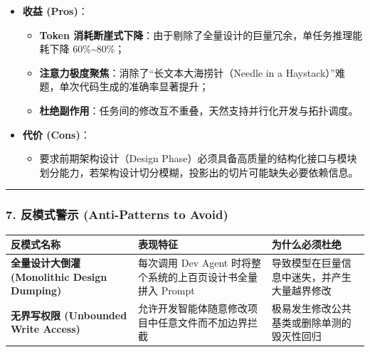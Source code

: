 \begin{itemize}
\tightlist
\item
  \textbf{收益 (Pros)}：

  \begin{itemize}
  \tightlist
  \item
    \textbf{Token
    消耗断崖式下降}：由于剔除了全量设计的巨量冗余，单任务推理能耗下降
    60\%\textasciitilde80\%；
  \item
    \textbf{注意力极度聚焦}：消除了``长文本大海捞针（Needle in a
    Haystack）''难题，单次代码生成的准确率显著提升；
  \item
    \textbf{杜绝副作用}：任务间的修改互不重叠，天然支持并行化开发与拓扑调度。
  \end{itemize}
\item
  \textbf{代价 (Cons)}：

  \begin{itemize}
  \tightlist
  \item
    要求前期架构设计（Design
    Phase）必须具备高质量的结构化接口与模块划分能力，若架构设计切分模糊，投影出的切片可能缺失必要依赖信息。
  \end{itemize}
\end{itemize}

\begin{center}\rule{0.5\linewidth}{0.5pt}\end{center}

\subsubsection{7. 反模式警示 (Anti-Patterns to
Avoid)}\label{ux53cdux6a21ux5f0fux8b66ux793a-anti-patterns-to-avoid-3}

{\def\LTcaptype{} %
\begin{longtable}[]{@{}
  >{\raggedright\arraybackslash}p{}
  >{\raggedright\arraybackslash}p{}
  >{\raggedright\arraybackslash}p{}@{}}
\toprule\noalign{}
\begin{minipage}[b]{\linewidth}\raggedright
反模式名称
\end{minipage} & \begin{minipage}[b]{\linewidth}\raggedright
表现特征
\end{minipage} & \begin{minipage}[b]{\linewidth}\raggedright
为什么必须杜绝
\end{minipage} \\
\midrule\noalign{}
\endhead
\bottomrule\noalign{}
\endlastfoot
\textbf{全量设计大倒灌 (Monolithic Design Dumping)} & 每次调用 Dev Agent
时将整个系统的上百页设计书全量拼入 Prompt &
导致模型在巨量信息中迷失，并产生大量越界修改 \\
\textbf{无界写权限 (Unbounded Write Access)} &
允许开发智能体随意修改项目中任意文件而不加边界拦截 &
极易发生修改公共基类或删除单测的毁灭性回归 \\
\end{longtable}
}

